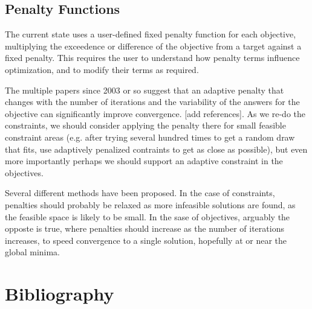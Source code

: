 \documentclass[12pt,letterpaper,english]{article}
\begin{document}
\subsection{Penalty Functions \label{sec:penalty}}
The current state uses a user-defined fixed penalty function for each objective, multiplying the exceedence or difference of the objective from a target against a fixed penalty.  This requires the user to understand how penalty terms influence optimization, and to modify their terms as required.

The multiple papers since 2003 or so suggest that an adaptive penalty that changes with the number of iterations and the variability of the answers for the objective can significantly improve convergence. [add references].  As we re-do the constraints, we should consider applying the penalty there for small feasible constraint areas (e.g. after trying several hundred times to get a random draw that fits, use adaptively penalized contraints to get as close as possible), but even more importantly perhaps we should support an adaptive constraint in the objectives.

Several different methods have been proposed.  In the case of constraints,
penalties should probably be relaxed as more infeasible solutions are found, as the feasible space is likely to be small.  In the sase of objectives, arguably the opposte is true, where penalties should increase as the number of iterations increases, to speed convergence to a single solution, hopefully at or near the global minima.


\section{Bibliography}


\end{document}
